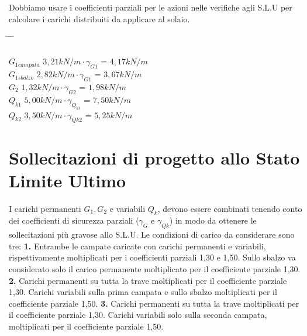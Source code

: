 \documentclass[a4paper,12pt, oneside]{book}
\begin{document}
    Dobbiamo usare i coefficienti parziali per le azioni nelle verifiche agli S.L.U per calcolare i carichi distribuiti da applicare al solaio.
    
    \begin{tabbing}
    	\phantom{Campata} \hspace{1em} \= \hspace{10em} \= \hspace{2em} \= \hspace{1em}\\\\
    	$G_{1campata}$    \> $3,21kN/m\cdot\gamma_{G1}$ \> = \> $4,17kN/m$ \\
    	$G_{1sbalzo}$     \> $2,82kN/m\cdot\gamma_{G1}$ \> = \> $3,67kN/m$ \\
    	$G_2$    \> $1,32kN/m\cdot\gamma_{G2}$ \> = \> $1,98kN/m$ \\ 
    	$Q_{k1}$ \> $5,00kN/m\cdot\gamma_{Q_{k1}}$ \> = \> $7,50kN/m$ \\       
    	$Q_{k2}$ \> $3,50kN/m\cdot\gamma_{Q{k2}}$ \> = \> $5,25kN/m$                    
    \end{tabbing}	
    
    \chapter{Sollecitazioni di progetto allo Stato Limite Ultimo}
    
    I carichi permanenti $G_1, G_2$ e variabili $Q_k$, devono essere combinati tenendo conto dei coefficienti di sicurezza parziali ($\gamma_{G}$ e $\gamma_{Qk}$) in modo da ottenere le sollecitazioni più gravose allo S.L.U. Le condizioni di carico da considerare sono tre:
    \leavevmode\newline
    \leavevmode\newline
    \phantom{12}\textbf{1.} Entrambe le campate caricate con carichi permanenti e variabili, rispettivamente moltiplicati per i coefficienti parziali 1,30 e 1,50. Sullo sbalzo va considerato solo il carico permanente moltiplicato per il coefficiente parziale 1,30.
    \leavevmode\newline
    \phantom{12}\textbf{2.} Carichi permanenti su tutta la trave moltiplicati per il coefficiente parziale 1,30. Carichi variabili sulla prima campata e sullo sbalzo moltiplicati per il coefficiente parziale 1,50. 
    \leavevmode\newline
    \phantom{12}\textbf{3.} Carichi permanenti su tutta la trave moltiplicati per il coefficiente parziale 1,30. Carichi variabili solo sulla seconda campata, moltiplicati per il coefficiente parziale 1,50.
    
\end{document}
